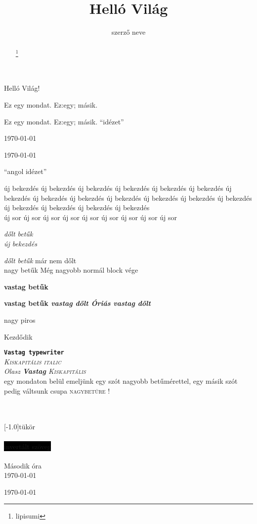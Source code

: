 \documentclass[]{article}
\begin{document}
\title{Helló Világ}
\author{szerző neve}
\date{}
\maketitle
\begin{abstract}
\hulipsum[1-2]
\footnote{lipisumi}
\end{abstract}



Helló Világ!

Ez egy mondat. Ez:egy; másik.

\frenchspacing
Ez egy mondat. Ez:egy; másik. ``idézet''



\today

\today

``angol idézet'' \par
új bekezdés új bekezdés új bekezdés új bekezdés új bekezdés új bekezdés új bekezdés új bekezdés új bekezdés új bekezdés új bekezdés új bekezdés új bekezdés új bekezdés új  bekezdés új bekezdés új bekezdés\\
új sor új sor új sor\newline
új sor új sor új sor új sor új sor új sor

{\itshape dőlt betűk \\
új bekezdés}

\textit{dőlt betűk} már nem dőlt\\
{\Large nagy betűk \Huge Még nagyobb \normalsize normál}
block vége

\textbf{vastag betűk}

\textbf{vastag betűk \textit{vastag dőlt \Huge Óriás vastag dőlt}}

{\Large nagy
{\color{red}
piros}}

Kezdődik

\texttt{\textbf{Vastag typewriter}}\\
\textsc{\textit{Kiskapitális italic}}\\
\emph{\textit{Olasz} \textbf{Vastag} \textsc{Kiskapitális}}\\
 egy mondaton belül emeljünk egy szót nagyobb {\Large betűmérettel}, egy másik
szót pedig váltsunk csupa \textsc{nagybetűre} !

\\
\\
\scalebox{2.0}[-1.0]{tükör}\\
 \\
\colorbox{black}{{\color {white} invertált szöveg}}\\
\\
Második óra\\
{
\setlength{\parindent}{0pt}
\setlength{\parskip}{15pt}
\Blindtext[3]
\today}

{
\begin{flushright}
\hulipsum [1-2]
\today
\end{flushright}}

{\begin{otherlanguage}{latin}
\linespread{1.6}\selectfont
\lipsum[2-4]

\end{otherlanguage}}
\end{document}
